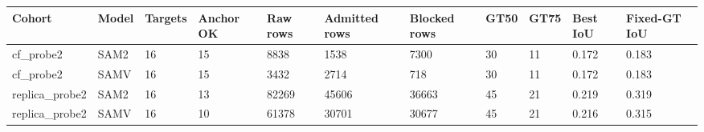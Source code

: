 \begin{tabular}{lllllllllll}
\toprule
Cohort & Model & Targets & Anchor OK & Raw rows & Admitted rows & Blocked rows & GT50 & GT75 & Best IoU & Fixed-GT IoU \\
\midrule
cf\_probe2 & SAM2 & 16 & 15 & 8838 & 1538 & 7300 & 30 & 11 & 0.172 & 0.183 \\
cf\_probe2 & SAMV & 16 & 15 & 3432 & 2714 & 718 & 30 & 11 & 0.172 & 0.183 \\
replica\_probe2 & SAM2 & 16 & 13 & 82269 & 45606 & 36663 & 45 & 21 & 0.219 & 0.319 \\
replica\_probe2 & SAMV & 16 & 10 & 61378 & 30701 & 30677 & 45 & 21 & 0.216 & 0.315 \\
\bottomrule
\end{tabular}
